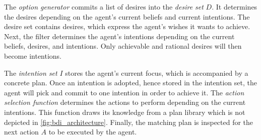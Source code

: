 The \emph{option generator} commits a list of desires into the \emph{desire set} $D$.
It determines the desires depending on the agent's current beliefs and current intentions.
The desire set contains desires, which express the agent's wishes it wants to achieve.
Next, the filter determines the agent's intentions depending on the current beliefs, desires, and intentions.
Only achievable and rational desires will then become intentions.

The \emph{intention set} $I$ stores the agent's current focus, which is accompanied by a concrete plan.
Once an intention is adopted, hence stored in the intention set, the agent will pick and commit to one intention in order to achieve it.
The \emph{action selection function} determines the actions to perform depending on the current intentions.
This function draws its knowledge from a plan library which is not depicted in \autoref{fig:bdi_architecture}.
Finally, the matching plan is inspected for the next action $A$ to be executed by the agent.

